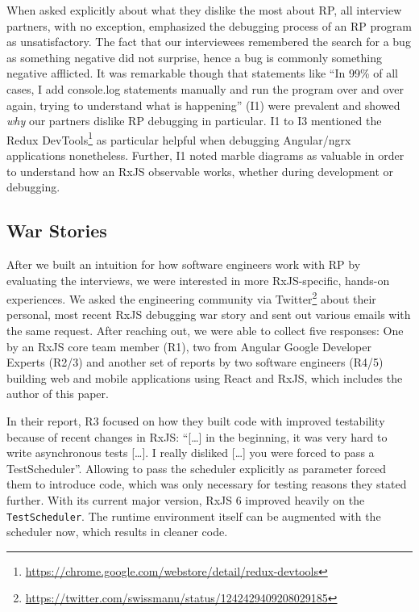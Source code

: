 \documentclass[sigplan,screen,review]{acmart}
\begin{document}
When asked explicitly about what they dislike the most about RP, all interview partners, with no exception, emphasized the debugging process of an RP program as unsatisfactory. The fact that our interviewees remembered the search for a bug as something negative did not surprise, hence a bug is commonly something negative afflicted. It was remarkable though that statements like ``In 99\% of all cases, I add console.log statements manually and run the program over and over again, trying to understand what is happening'' (I1) were prevalent and showed \emph{why} our partners dislike RP debugging in particular. I1 to I3 mentioned the Redux DevTools\footnote{\url{https://chrome.google.com/webstore/detail/redux-devtools}} as particular helpful when debugging Angular/ngrx applications nonetheless. Further, I1 noted marble diagrams as valuable in order to understand how an RxJS observable works, whether during development or debugging.

\subsection{War Stories}

After we built an intuition for how software engineers work with RP by evaluating the interviews, we were interested in more RxJS-specific, hands-on experiences. We asked the engineering community via Twitter\footnote{\url{https://twitter.com/swissmanu/status/1242429409208029185}} about their personal, most recent RxJS debugging war story and sent out various emails with the same request. After reaching out, we were able to collect five responses: One by an RxJS core team member (R1), two from Angular Google Developer Experts (R2/3) and another set of reports by two software engineers (R4/5) building web and mobile applications using React and RxJS, which includes the author of this paper.

In their report, R3 focused on how they built code with improved testability because of recent changes in RxJS: ``[\dots] in the beginning, it was very hard to write asynchronous tests [\dots]. I really disliked [\dots] you were forced to pass a TestScheduler''. Allowing to pass the scheduler explicitly as parameter forced them to introduce code, which was only necessary for testing reasons they stated further. With its current major version, RxJS 6 improved heavily on the  \texttt{TestScheduler}. The runtime environment itself can be augmented with the scheduler now, which results in cleaner code.
\end{document}

